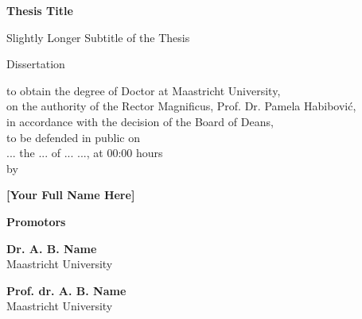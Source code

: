 \newpage
\begingroup
\thispagestyle{empty}
\centering
\vspace*{3cm}
\par\normalfont\fontsize{42}{30}\sffamily\selectfont
\color{offBlack}\textbf{Thesis Title}

\par\normalfont\fontsize{12}{12}\sffamily\selectfont
\color{offBlack} Slightly Longer Subtitle of the Thesis

\vspace{1.5cm}
Dissertation
\vspace{1.5cm}

\par\normalfont\fontsize{8}{10}\sffamily\selectfont
\color{offBlack} to obtain the degree of Doctor at Maastricht University,\\ on the authority of the Rector Magnificus, Prof. Dr. Pamela Habibović,\\ in accordance with the decision of the Board of Deans,\\ to be defended in public on\\ ... the ... of ... ..., at 00:00 hours\\ by\par 

\par\normalfont\fontsize{9}{11}\sffamily\selectfont
\color{offBlack} \textbf{[Your Full Name Here]}\par
\endgroup

\newpage
\begingroup
\thispagestyle{empty}

\par\noindent\normalfont\fontsize{15}{8}\sffamily\selectfont
\color{offBlack!70}\textbf{Promotors\\}\par

\par\noindent\normalfont\fontsize{10}{10}\sffamily\selectfont
\color{offBlack}\textbf{Dr. A. B. Name\\}
\color{offBlack!60}Maastricht University\par

\par\noindent\normalfont\fontsize{10}{10}\sffamily\selectfont
\color{offBlack}\textbf{Prof. dr. A. B. Name\\}
\color{offBlack!60}Maastricht University\par

